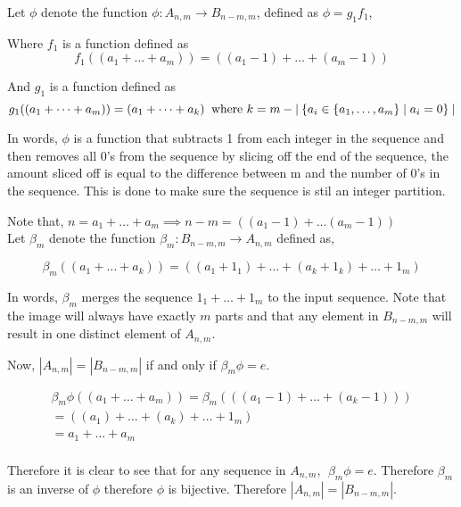 \begin{solution}

  
  Let $\phi$ denote the function $ \phi: A_{n,m} \rightarrow B_{n-m,m}$, defined as $\phi = g_1f_1$,

  Where $f_1$ is a function defined as $$ f_1((a_1 + \dots + a_m)) = ((a_1 - 1) + \dots + (a_m - 1)) $$ 

  And $g_1$ is a function defined as $$ g_1((a_1 + \dots + a_m)) = (a_1 + \dots + a_k)\;\; \text{where $ k = m - |\:\{ a_i \in \{a_1,\dots,a_m\} \;|\; a_i = 0 \}\:|$} $$

  In words, $\phi$ is a function that subtracts 1 from each integer in the sequence and then removes all 0's from the sequence by slicing off the end of the sequence, 
  the amount sliced off is equal to the difference between m and the number of 0's in the sequence. This is done to make sure the sequence is stil an integer partition.

  Note that, $n = a_1 + \dots + a_m \implies n - m = ((a_1 - 1) + \dots (a_m - 1))$\\

  Let $\beta_m$ denote the function $ \beta_m: B_{n-m,m} \rightarrow A_{n,m}$ defined as,

  $$ \beta_m((a_1 + \dots + a_k)) = ((a_1 + 1_1) + \dots + (a_k+1_k) + \dots + 1_m) $$
  
  In words, $\beta_m$ merges the sequence $ 1_1 + \dots + 1_m $ to the input sequence. Note
  that the image will always have exactly $m$ parts and that any element in $B_{n-m,m}$ will 
  result in one distinct element of $A_{n,m}$.

  Now, $|A_{n,m}| = |B_{n-m,m}|$ if and only if $\beta_m\phi = e$.

  \begin{align*}
    \beta_m\phi((a_1 +\dots+ a_m)) = \beta_m(((a_1-1) + \dots + (a_k - 1))) \\    
    = ((a_1) +\dots+ (a_k) + \dots + 1_m) \\
    = a_1 + \dots + a_m \\
  \end{align*}

  Therefore it is clear to see that for any sequence in $A_{n,m}$, $\;\beta_m\phi = e$. Therefore $\beta_m$ is an inverse of $\phi$ therefore $\phi$ is bijective. Therefore $ |A_{n,m}| = |B_{n-m,m}|$. 


\end{solution}
 
